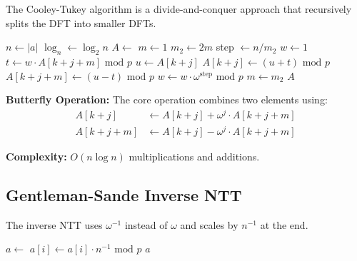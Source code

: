 \documentclass[11pt,a4paper]{article}
\newcommand{\bmod}{\text{ mod }}
\begin{document}
The Cooley-Tukey algorithm is a divide-and-conquer approach that recursively splits the DFT into smaller DFTs.

\begin{algorithm}[H]
\caption{Cooley-Tukey Iterative NTT}
\begin{algorithmic}[1]
    \State $n \gets |a|$
    \State $\log_n \gets \log_2 n$
    \State $A \gets$ 
    \State $m \gets 1$
        \State $m_2 \gets 2m$
        \State step $\gets n / m_2$
            \State $w \gets 1$
                \State $t \gets w \cdot A[k + j + m] \bmod p$ 
                \State $u \gets A[k + j]$
                \State $A[k + j] \gets (u + t) \bmod p$
                \State $A[k + j + m] \gets (u - t) \bmod p$
                \State $w \gets w \cdot \omega^{\text{step}} \bmod p$ 
            \EndFor
        \EndFor
        \State $m \gets m_2$
    \EndFor
    \State \Return $A$
\EndFunction
\end{algorithmic}
\end{algorithm}

\textbf{Butterfly Operation:}
The core operation combines two elements using:
\begin{align}
A[k+j] &\gets A[k+j] + \omega^j \cdot A[k+j+m] \\
A[k+j+m] &\gets A[k+j] - \omega^j \cdot A[k+j+m]
\end{align}

\textbf{Complexity:} $O(n \log n)$ multiplications and additions.

\subsection{Gentleman-Sande Inverse NTT}

The inverse NTT uses $\omega^{-1}$ instead of $\omega$ and scales by $n^{-1}$ at the end.

\begin{algorithm}[H]
\caption{Inverse NTT}
\begin{algorithmic}[1]
    \State $a \gets$  
        \State $a[i] \gets a[i] \cdot n^{-1} \bmod p$ 
    \EndFor
    \State \Return $a$
\EndFunction
\end{algorithmic}
\end{algorithm}
\end{document}
